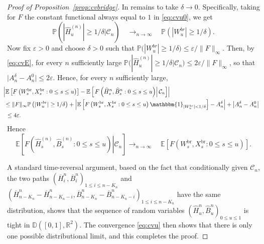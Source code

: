 \documentclass[10pt]{amsart}
\theoremstyle{definition}\newtheorem{defi}[theo]{Definition}\newtheorem{rema}[theo]{Remark}\newtheorem{exam}[theo]{Example}\newtheorem{exem}[theo]{Example}\newtheorem{nota}[theo]{Notation}
\newcommand{\R}{\mathbb{R}}
\newcommand{\D}{\mathbb{D}}
\def\oB{\overline{B}}
\def\hB{\widehat{B}}
\def\oH{\overline{H}}
\def\hH{\widehat{H}}
\renewcommand{\epsilon}{\varepsilon}
\newcommand\Es[1]{\mathbb{E}\left[#1\right]}
\renewcommand\Pr[1]{\mathbb{P}\left(#1\right)}
\newcommand\Prb[1]{\mathbb{P}\big(#1\big)}
\begin{document}
\begin{proof}[Proof of Proposition~\ref{prop:cvbridge}]
In remains to take $\delta \rightarrow 0$. Specifically,
taking for $F$ the constant functional always equal to $1$ in \eqref{eq:cvu0}, we get
\begin{equation}
\label{eq:cvE}\Pr{ |\hH^{(n)}_{u}| \geq 1/\delta \big|  \mathcal{C}_{n} }  \quad \mathop{\longrightarrow}_{n \rightarrow \infty} \quad  \Pr{|W^{br}_{u}| \geq 1/\delta}.
\end{equation}
Now fix $\epsilon>0$ and choose $\delta>0$ such that $  \Prb{|W^{br}_{u}| \geq 1/\delta} \leq \epsilon/ \| F \|_{\infty}$. Then, by \eqref{eq:cvE},  for every $n$ sufficiently large  $\Prb{  |\hH^{(n)}_{u}| \geq  1/\delta \big| \mathcal{C}_{n}} \leq 2\epsilon / \| F \|_{\infty}$, so that $\big| A_{n}^{\delta} - A_{n}^{0} \big| \leq 2 \epsilon$. Hence, for every $n$ sufficiently large,
\begin{align*}
  & \hspace{-3mm} \left| \Es{F \left(   W^{\textrm{br}}_{s},X^{\textrm{br}}_{s} : 0 \leq s \leq u \right) }- \Es{ \left. F \left(  \hH^{n}_{s},\hB^{n}_{s} : 0 \leq s \leq u \right) \right| \mathcal{C}_{n}}  \right|\\
  & \hspace{-2mm} \leq \| F \|_{\infty} \Pr{|W^{br}_{u}| \geq 1/\delta} +
\left| \Es{F \left(   W^{\textrm{br}}_{s},X^{\textrm{br}}_{s} : 0 \leq s \leq u \right)\mathbbm{1}_{|W^{br}_{u}|<1/\delta}}  -A_{n}^{\delta}  \right| +  \left| A_{n}^{\delta} - A_{n}^{0} \right | \\
& \hspace{-1mm}\leq 4 \epsilon.
\end{align*}
Hence
\begin{equation}
\label{eq:cvu}\Es{ \left. F \left(  \hH^{(n)}_{s},  \hB^{(n)}_{s} : 0 \leq s \leq u \right) \right|  \mathcal{C}_{n} }   \mathop{\longrightarrow}_{n \rightarrow \infty} \quad \Es{F \left(  W^{\textrm{br}}_{s},X^{\textrm{br}}_{s} : 0 \leq s \leq u \right) }.
\end{equation}

A standard time-reversal argument, based on the fact that conditionally given $ \mathcal{C}_{n}$, the two paths  $(\oH^{n}_{i},\oB^{n}_{i})_{1 \leq i \leq n-K_{n}}$ and $(\oH^{n}_{n-K_{n}}-\oH^{n}_{n-K_{n}-i},\oB^{n}_{n-K_{n}}-\oB^{n}_{n-K_{n}-i})_{1 \leq i \leq n-K_{n}}$ have the same distribution, shows that the sequence of random variables $  (  \hH^{n}_{u}, \hB^{n}_{u} )_{0 \leq u \leq 1}$ is tight in $\D([0,1],\R^{2})$. The convergence \eqref{eq:cvu} then shows that there is only one possible distributional limit, and this completes the proof.
\end{proof}
\end{document}
